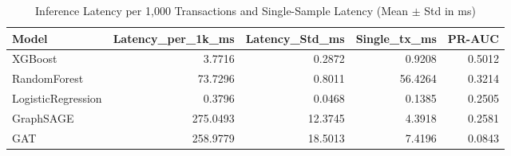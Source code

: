 \begin{table}
\caption{Inference Latency per 1,000 Transactions and Single-Sample Latency (Mean $\pm$ Std in ms)}
\label{tab:latency_benchmark}
\begin{tabular}{lrrrr}
\toprule
Model & Latency_per_1k_ms & Latency_Std_ms & Single_tx_ms & PR-AUC \\
\midrule
XGBoost & 3.7716 & 0.2872 & 0.9208 & 0.5012 \\
RandomForest & 73.7296 & 0.8011 & 56.4264 & 0.3214 \\
LogisticRegression & 0.3796 & 0.0468 & 0.1385 & 0.2505 \\
GraphSAGE & 275.0493 & 12.3745 & 4.3918 & 0.2581 \\
GAT & 258.9779 & 18.5013 & 7.4196 & 0.0843 \\
\bottomrule
\end{tabular}
\end{table}
